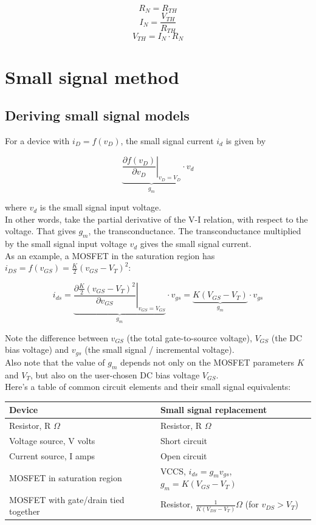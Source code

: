 \documentclass[12pt,a4paper]{report}
\begin{document}
\[ R_N = R_{TH} \]
\[ I_N = \frac{V_{TH}}{R_{TH}} \]
\[ V_{TH} = I_N \cdot R_N \]


\chapter{Small signal method}
\section{Deriving small signal models}

For a device with $i_D = f(v_D)$, the small signal current $i_d$ is given by

\[ \underbrace { \left. \frac{\partial f(v_D)}{\partial v_D} \right|_{v_D=V_D} }_{\displaystyle g_m} \cdot v_d \]

where $v_d$ is the small signal input voltage.\\
In other words, take the partial derivative of the V-I relation, with respect to the voltage. That gives $g_m$, the transconductance. The transconductance multiplied by the small signal input voltage $v_d$ gives the small signal current.\\

As an example, a MOSFET in the saturation region has $i_{DS} = f(v_{GS}) = \frac{K}{2}(v_{GS} - V_T)^2$:

\[ i_{ds} = \underbrace { \left. \frac{ \partial \frac{K}{2}(v_{GS} - V_T)^2 }{\partial v_{GS}} \right|_{v_{GS}=V_{GS} }}_{\displaystyle g_m} \cdot v_{gs} = \underbrace{ K(V_{GS} - V_T)}_{\displaystyle g_m} \cdot v_{gs} \]

Note the difference between $v_{GS}$ (the total gate-to-source voltage), $V_{GS}$ (the DC bias voltage) and $v_{gs}$ (the small signal / incremental voltage). \\
Also note that the value of $g_m$ depends not only on the MOSFET parameters $K$ and $V_T$, but also on the user-chosen DC bias voltage $V_{GS}$.\\

Here's a table of common circuit elements and their small signal equivalents:\\

\begin{tabular}{| l | l |}
\hline
Device & Small signal replacement \\ \hline
Resistor, R $\Omega$        & Resistor, R $\Omega$ \\ \hline
Voltage source, V volts     & Short circuit \\ \hline
Current source, I amps      & Open circuit \\ \hline
MOSFET in saturation region & VCCS, $i_{ds} = g_m v_{gs}$, $g_m = K(V_{GS} - V_T)$ \\ \hline 
MOSFET with gate/drain tied together & Resistor, $\displaystyle \frac{1}{K(V_{DS} - V_T)} \Omega$ (for $v_{DS} > V_T$) \\ \hline
\end{tabular}
\end{document}
